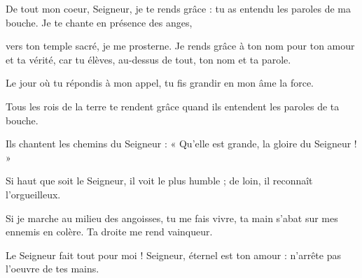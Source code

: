 \item De tout mon coeur, Seigneur, je te rends grâce : tu as entendu les paroles de ma bouche. Je te chante en présence des anges,

\item vers ton temple sacré, je me prosterne. Je rends grâce à ton nom pour ton amour et ta vérité, car tu élèves, au-dessus de tout, ton nom et ta parole.

\item Le jour où tu répondis à mon appel, tu fis grandir en mon âme la force.

\item Tous les rois de la terre te rendent grâce quand ils entendent les paroles de ta bouche.

\item Ils chantent les chemins du Seigneur : « Qu'elle est grande, la gloire du Seigneur ! »

\item Si haut que soit le Seigneur, il voit le plus humble ; de loin, il reconnaît l'orgueilleux.

\item Si je marche au milieu des angoisses, tu me fais vivre, ta main s'abat sur mes ennemis en colère. Ta droite me rend vainqueur.

\item Le Seigneur fait tout pour moi ! Seigneur, éternel est ton amour : n'arrête pas l'oeuvre de tes mains.
